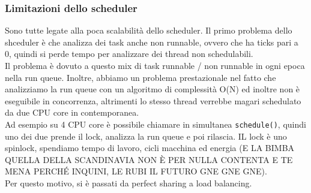 \documentclass[12pt, oneside]{extbook}
\begin{document}
\subsubsection{Limitazioni dello scheduler}
Sono tutte legate alla poca scalabilità dello scheduler. Il primo problema dello shceduler è che analizza dei task anche non runnable, ovvero che ha ticks pari a 0, quindi si perde tempo per analizzare dei thread non schedulabili.\\Il problema è dovuto a questo mix di task runnable / non runnable in ogni epoca nella run queue. Inoltre, abbiamo un problema prestazionale nel fatto che analizziamo la run queue con un algoritmo di complessità O(N) ed inoltre non è eseguibile in concorrenza, altrimenti lo stesso thread verrebbe magari schedulato da due CPU core in contemporanea.\\Ad esempio su 4 CPU core è possibile chiamare in simultanea \texttt{schedule()}, quindi uno dei due prende il lock, analizza la run queue e poi rilascia. IL lock è uno spinlock, spendiamo tempo di lavoro, cicli macchina ed energia (E LA BIMBA QUELLA DELLA SCANDINAVIA NON È PER NULLA CONTENTA E TE MENA PERCHÉ INQUINI, LE RUBI IL FUTURO GNE GNE GNE).\\Per questo motivo, si è passati da perfect sharing a load balancing.
\end{document}
